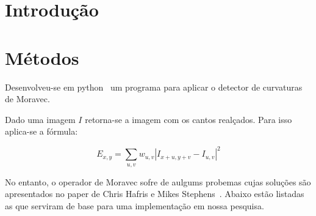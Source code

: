 \documentclass[10pt,a4paper]{article}
\begin{document}
\vspace{2mm}
\newpage

\section{Introdução}



\section{Métodos}

Desenvolveu-se em python~\cite{python} um programa para aplicar o
detector de curvaturas de Moravec.

Dado uma imagem $I$ retorna-se a imagem com os cantos realçados.
Para isso aplica-se a fórmula:

\begin{equation}
E_{x,y}=\sum_{u,v}w_{u,v}\left | I_{x+u,y+v}-I_{u,v}  \right |^2
\end{equation}

No entanto, o operador de Moravec sofre de aulgums probemas cujas soluções são apresentados no paper de  Chris Hafris e
Mikes Stephens~\cite{paper}. Abaixo estão listadas as que serviram de
base para uma implementação  em
nossa pesquisa. 
\end{document}
